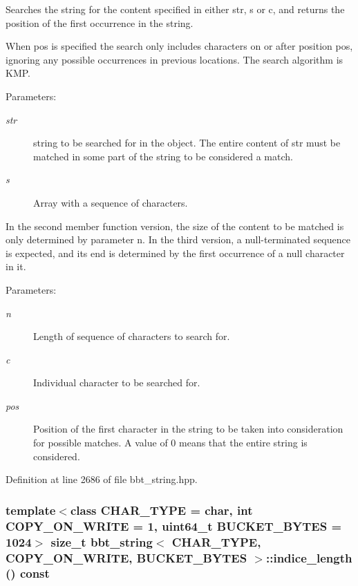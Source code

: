 Searches the string for the content specified in either str, s or c, and returns the position of the first occurrence in the string.

When pos is specified the search only includes characters on or after position pos, ignoring any possible occurrences in previous locations. The search algorithm is KMP.

\begin{Desc}
\item[Parameters:]
\begin{description}
\item[{\em str}]string to be searched for in the object. The entire content of str must be matched in some part of the string to be considered a match. \item[{\em s}]Array with a sequence of characters.\end{description}
\end{Desc}
In the second member function version, the size of the content to be matched is only determined by parameter n. In the third version, a null-terminated sequence is expected, and its end is determined by the first occurrence of a null character in it.

\begin{Desc}
\item[Parameters:]
\begin{description}
\item[{\em n}]Length of sequence of characters to search for. \item[{\em c}]Individual character to be searched for. \item[{\em pos}]Position of the first character in the string to be taken into consideration for possible matches. A value of 0 means that the entire string is considered. \end{description}
\end{Desc}


Definition at line 2686 of file bbt\_\-string.hpp.\hypertarget{classbbt__string_f7d72888ed6e7c1b6f07d515b08b90dd}{
\subsubsection[{indice\_\-length}]{\setlength{\rightskip}{0pt plus 5cm}template$<$class CHAR\_\-TYPE  = char, int COPY\_\-ON\_\-WRITE = 1, uint64\_\-t BUCKET\_\-BYTES = 1024$>$ size\_\-t {\bf bbt\_\-string}$<$ CHAR\_\-TYPE, COPY\_\-ON\_\-WRITE, BUCKET\_\-BYTES $>$::indice\_\-length () const}}
\label{classbbt__string_f7d72888ed6e7c1b6f07d515b08b90dd}


